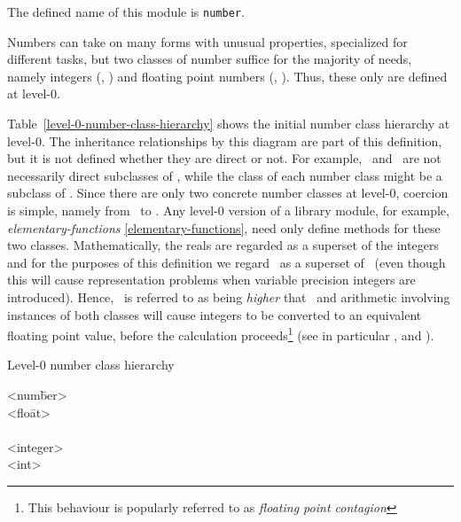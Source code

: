 \begin{optDefinition}
\noindent
The defined name of this module is {\tt number}.

Numbers can take on many forms with unusual properties, specialized for
different tasks, but two classes of number suffice for the majority of needs,
namely integers (, ) and floating point
numbers (, ).  Thus, these only are
defined at level-0.

Table~\ref{level-0-number-class-hierarchy} shows the initial number class
hierarchy at level-0.  The inheritance relationships by this diagram are part of
this definition, but it is not defined whether they are direct or not.  For
example, \ and \ are not necessarily direct
subclasses of , while the class of each number class might be a
subclass of .  Since there are only two concrete number
classes at level-0,
coercion is simple,
namely from \ to .  Any
level-0 version of a library module, for example, {\em elementary-functions}
\ref{elementary-functions}, need only define methods for these two classes.
Mathematically, the reals are regarded as a superset of the integers and for the
purposes of this definition we regard \ as a superset of
\ (even though this will cause representation problems when
variable precision integers are introduced).  Hence, \ is
referred to as being {\em higher} that \ and arithmetic
involving instances of both classes will cause integers to be converted to an
equivalent floating point value, before the calculation proceeds\footnote{This
    behaviour is popularly referred to as {\em floating point contagion}} (see
in particular ,
 and ).

\begin{table}[h]
\caption{Level-0 number class hierarchy}
\label{level-0-number-class-hierarchy}
\begin{center}
{\tt\begin{tabbing}
<num\=ber> \\
    \><flo\=at> \\
    \>     \\
    \><integer> \\
    \>    \><int>
\end{tabbing}}
\end{center}
\end{table}


\end{optDefinition}
